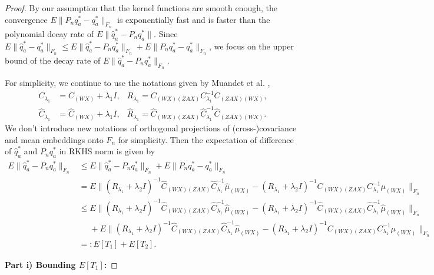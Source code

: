 \begin{proof}
    By our assumption that the kernel functions are smooth enough, 
    the convergence $E\|P_nq^*_a-q^*_a\|_{F_n}$ is exponentially fast and is faster than the polynomial decay rate of $E\|\widehat{q}^*_a-P_nq^*_a\|$. 
    Since $E\|\widehat{q}_a^*-q_a^*\|_{F_n}\leq E\|\widehat{q}_a^*-P_nq_a^*\|_{F_n}+E\|P_nq^*_a-q^*_a\|_{F_n}$, 
    we focus on the upper bound of the decay rate of $E\|\widehat{q}_a^*-P_nq_a^*\|_{F_n}$. 

    For simplicity, we continue to use the notations given by Muandet et al. \cite{muandet2020dualinstrumentalvariableregression}, 
    \begin{align*}
        C_{\lambda_1}&=C_{(WX)}+\lambda_1I, & R_{\lambda_1}= C_{(WX)(ZAX)}C_{\lambda_1}^{-1}C_{(ZAX)(WX)}, \\
        \widehat{C}_{\lambda_1}&=\widehat{C}_{(WX)}+\lambda_1I, & \widehat{R}_{\lambda_1}=\widehat{C}_{(WX)(ZAX)}\widehat{C}_{\lambda_1}^{-1}\widehat{C}_{(ZAX)(WX)}.
    \end{align*}
    We don't introduce new notations of orthogonal projections of (cross-)covariance and mean embeddings onto $F_n$ for simplicity. 
    Then the expectation of difference of $\widehat{q}_a^*$ and $P_nq_a^*$ in RKHS norm is given by  
    \begin{align*}
        E\|\widehat{q}_a^*-P_nq_a^*\|_{F_n}&\leq E\|\widehat{q}_a^*-P_nq^*_a\|_{F_n} + E\|P_nq^*_a-q^*_a\|_{F_n} \\
                                      &=E\|(\widehat{R}_{\lambda_1}+\lambda_2I)^{-1}\widehat{C}_{(WX)(ZAX)}\widehat{C}^{-1}_{\lambda_1}\widehat{\mu}_{(WX)}-(R_{\lambda_1}+\lambda_2I)^{-1}C_{(WX)(ZAX)}C^{-1}_{\lambda_1}\mu_{(WX)}\|_{F_n} \\
                                      &\leq E\|(\widehat{R}_{\lambda_1}+\lambda_2I)^{-1}\widehat{C}_{(WX)(ZAX)}\widehat{C}^{-1}_{\lambda_1}\widehat{\mu}_{(WX)}-(R_{\lambda_1}+\lambda_2I)^{-1}\widehat{C}_{(WX)(ZAX)}\widehat{C}^{-1}_{\lambda_1}\widehat{\mu}_{(WX)}\|_{F_n} \\
                                      &\phantom{\leq}+ E\|(R_{\lambda_1}+\lambda_2I)^{-1}\widehat{C}_{(WX)(ZAX)}\widehat{C}^{-1}_{\lambda_1}\widehat{\mu}_{(WX)}-(R_{\lambda_1}+\lambda_2I)^{-1}C_{(WX)(ZAX)}C^{-1}_{\lambda_1}\mu_{(WX)}\|_{F_n} \\
                                      &=:E[T_1]+E[T_2]. 
    \end{align*}

    \textbf{Part i) Bounding $E[T_1]$:}


\end{proof}
